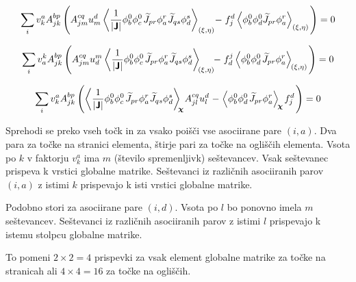 \begin{equation}
   \sum_i v^a_k A^{bp}_{jk} \left(A^{cq}_{jm} u^d_m \left\langle \frac{1}{|\bm{\mathsf{J}}|} \phi^0_b \phi^0_c \mkern2mu \widetilde{J}_{pr}  \phi^r_a \mkern1mu \widetilde{J}_{qs}  \phi^s_d \right\rangle_{(\xi, \eta)} \mkern-4mu - \mkern1mu f^d_j \left\langle\phi^0_b \phi^0_d \widetilde{J}_{pr}  \phi^r_a \right\rangle_{(\xi, \eta)} \mkern2mu \right) = 0
\end{equation}

\begin{equation}
   \sum_i v^k_a A^{bp}_{jk} \left(A^{cq}_{jm} u^m_d \left\langle \frac{1}{|\bm{\mathsf{J}}|} \phi^0_b \phi^0_c \mkern2mu \widetilde{J}_{pr}  \phi^r_a \mkern1mu \widetilde{J}_{qs}  \phi^s_d \right\rangle_{\mkern-4mu(\xi, \eta)} \mkern-6mu - \mkern1mu f^j_d \left\langle\phi^0_b \phi^0_d \mkern2mu \widetilde{J}_{pr}  \phi^r_a \right\rangle_{\mkern-2mu(\xi, \eta)} \mkern2mu \right) = 0
\end{equation}

\begin{equation}
   \sum_i v^a_k A^{bp}_{jk} \left( \left\langle \frac{1}{|\bm{\mathsf{J}}|} \phi^0_b \phi^0_c \mkern2mu \widetilde{J}_{pr}  \phi^r_a \mkern1mu \widetilde{J}_{qs}  \phi^s_d \right\rangle_{\mkern-5mu\bm{\chi}} \mkern-2mu A^{cq}_{jl} u^d_l \mkern1mu - \mkern1mu \left\langle\phi^0_b \phi^0_d \mkern2mu \widetilde{J}_{pr}  \phi^r_a \right\rangle_{\mkern-3mu\bm{\chi}} \mkern-1mu f^d_j \mkern2mu \right) = 0
\end{equation}

Sprehodi se preko vseh točk in za vsako poišči vse asociirane pare $(i, a)$. Dva para za točke na stranici elementa, štirje pari za točke na ogliščih elementa. Vsota po $k$ v faktorju $v^a_k$ ima $m$ (število spremenljivk) seštevancev. Vsak seštevanec prispeva k vrstici globalne matrike. Seštevanci iz različnih asociiranih parov $(i, a)$ z istimi $k$ prispevajo k isti vrstici globalne matrike.

Podobno stori za asociirane pare $(i, d)$. Vsota po $l$ bo ponovno imela $m$ seštevancev. Seštevanci iz različnih asociiranih parov z istimi $l$ prispevajo k istemu stolpcu globalne matrike.

To pomeni $2 \times 2 = 4$ prispevki za vsak element globalne matrike za točke na stranicah ali $4 \times 4 = 16$ za točke na ogliščih.